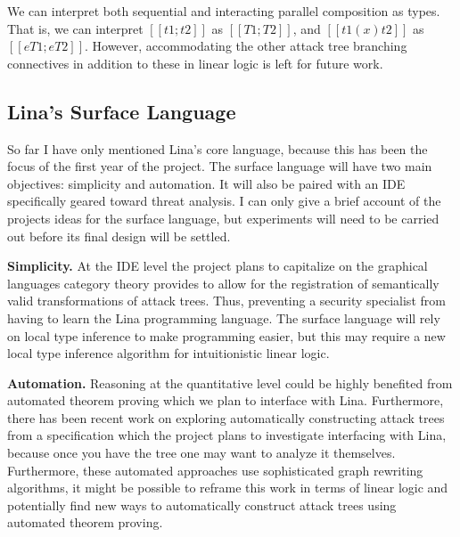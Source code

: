 \documentclass{llncs}
\begin{document}
We can interpret both sequential and interacting parallel composition
as types.  That is, we can interpret $[[t1 ; t2]]$ as $[[T1 ; T2]]$,
and $[[t1 (x) t2]]$ as $[[e T1 ; e T2]]$.  However, accommodating the
other attack tree branching connectives in addition to these in linear
logic is left for future work.

\subsection{Lina's Surface Language}
\label{subsec:linas_surface_language}

So far I have only mentioned Lina's core language, because this has
been the focus of the first year of the project.  The surface language
will have two main objectives: simplicity and automation.  It will
also be paired with an IDE specifically geared toward threat analysis.
I can only give a brief account of the projects ideas for the surface
language, but experiments will need to be carried out before its
final design will be settled.

\textbf{Simplicity.}  At the IDE level the project plans to capitalize
on the graphical languages category theory provides
\cite{Selinger:2009} to allow for the registration of semantically
valid transformations of attack trees.  Thus, preventing a security
specialist from having to learn the Lina programming language.  The
surface language will rely on local type inference to make programming
easier, but this may require a new local type inference algorithm for
intuitionistic linear logic.

\textbf{Automation.}  Reasoning at the quantitative level could be
highly benefited from automated theorem proving which we plan to
interface with Lina.  Furthermore, there has been recent work
\cite{essay69399,Sheyner:2002:AGA:829514.830526,6957121,essay69402} on
exploring automatically constructing attack trees from a specification
which the project plans to investigate interfacing with Lina, because
once you have the tree one may want to analyze it themselves.
Furthermore, these automated approaches use sophisticated graph
rewriting algorithms, it might be possible to reframe this work in
terms of linear logic and potentially find new ways to automatically
construct attack trees using automated theorem proving.
\end{document}

